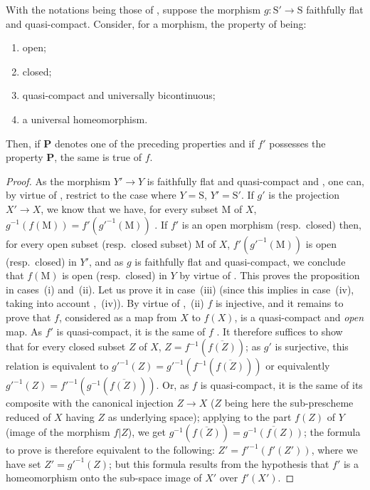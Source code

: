 \begin{proposition}[2.6.2]
\label{IV.2.6.2}
With the notations being those of , suppose the morphism
$g:\mathrm{S}'\to\mathrm{S}$ faithfully flat and quasi-compact. Consider, for a morphism, the property of being:
\begin{enumerate}[label=(\roman*)]
  \item open;
  \item closed;
  \item quasi-compact and universally bicontinuous;
  \item a universal homeomorphism.
\end{enumerate}
Then, if $\mathbf{P}$ denotes one of the preceding properties and if $f'$ possesses the property $\mathbf{P}$, the same is true
of $f$.
\end{proposition}


\begin{proof}
As the morphism $Y'\to Y$ is faithfully flat and quasi-compact  and
, one can, by virtue of , restrict to the case where $Y=\mathrm{S}$, $Y'=\mathrm{S}'$. If $g'$ is the
projection $X'\to X$, we know that we have, for every subset $\mathrm{M}$ of $X$, $g^{-1}(f(\mathrm{M}))=f'(g'^{-1}(\mathrm{M}))$
. If $f'$ is an open morphism (resp.\ closed) then, for every open subset
(resp.\ closed subset) $\mathrm{M}$ of $X$, $f'(g'^{-1}(\mathrm{M}))$ is open (resp.\ closed) in $Y'$, and as $g$
is faithfully flat and quasi-compact, we conclude that $f(\mathrm{M})$ is open (resp.\ closed)
in $Y$ by virtue of . This proves the proposition in cases~(i) and~(ii).
Let us prove it in case~(iii) (since this implies in case~(iv), taking into account
,~(iv)). By virtue of ,~(ii) $f$ is injective, and it remains to prove that $f$, considered
as a map from $X$ to $f(X)$, is a quasi-compact and \emph{open} map. As $f'$
is quasi-compact, it is the same of $f$ . It therefore suffices to show that for
every closed subset $Z$ of $X$, $Z=f^{-1}(\overline{f(Z)})$; as $g'$ is surjective, this relation
is equivalent to $g'^{-1}(Z)=g'^{-1}(f^{-1}(\overline{f(Z)}))$ or equivalently $g'^{-1}(Z)=f'^{-1}(g^{-1}(\overline{f(Z)}))$. Or,
as $f$ is quasi-compact, it is the same of its composite with the canonical injection
$Z\to X$ ($Z$ being here the sub-prescheme reduced of $X$ having $Z$ as underlying space);
applying  to the part $f(Z)$ of $Y$ (image of the morphism $f|Z$),
we get $g^{-1}(\overline{f(Z)})=\overline{g^{-1}(f(Z))}$; the formula to prove is therefore equivalent to the following:
$Z'=f'^{-1}(f'(Z'))$, where we have set $Z'=g'^{-1}(Z)$; but this formula results from the hypothesis
that $f'$ is a homeomorphism onto the sub-space image of $X'$ over $f'(X')$.
\end{proof}

